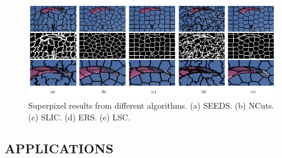 \begin{figure}[h!]
    \centering
    \includegraphics[width = 1 \linewidth]{images/paper2/superpixelsComparison.png}
    \centering
    \caption{Superpixel results from different algorithms. (a) SEEDS. (b) NCuts. (c) SLIC. (d) ERS. (e) LSC.}
    \label{fig: superpixelsComparison}
\end{figure}

\subsection{APPLICATIONS}
